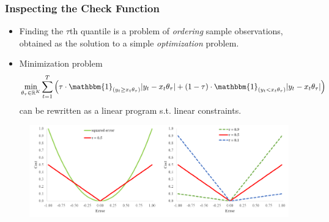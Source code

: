 \documentclass[xcolor=dvipsnames, xcolor=table, 10pt]{beamer}
\begin{document}
\begin{frame}
\frametitle{Inspecting the Check Function \citep{koenker_2005}}
\label{checkfct}
  \vspace{0.25cm}
  \begin{itemize}
    \item Finding the $\tau$th quantile is a problem of \emph{ordering} sample observations, obtained as the solution to a simple \emph{optimization} problem.
        \bigskip
    \item Minimization problem
    \begin{equation*}
\min_{\theta_{\tau} \in \mathbb{R}^K} \sum_{t=1}^{T} \left(\tau \cdot \mathbbm{1}_{(y_{t}\geq x_t\theta_{\tau})} \lvert y_{t} - x_t \theta_{\tau} \rvert + (1-\tau) \cdot \mathbbm{1}_{(y_{t} < x_t \theta_{\tau})} \lvert y_{t} - x_t \theta_{\tau} \rvert \right)
\end{equation*}
can be rewritten as a linear program s.t. linear constraints.
  \end{itemize}
\begin{figure}[!htb]
 \centering
 \includegraphics[width=0.75\linewidth]{Slides/Figures/quantile_reg_v2}
 \end{figure}
    \smallskip
    \hyperlink{qr}{}
\end{frame}


\end{document}
